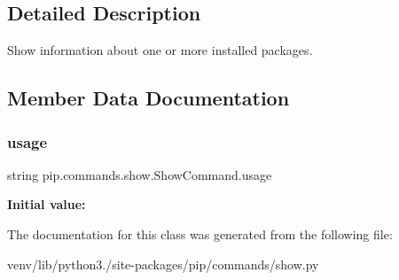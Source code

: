 \subsection{Detailed Description}
\begin{DoxyVerb}Show information about one or more installed packages.\end{DoxyVerb}
 

\subsection{Member Data Documentation}
\mbox{\label{classpip_1_1commands_1_1show_1_1_show_command_a6cfb3b232f5280a3cd563a7dda7b927f}} 
\subsubsection{\texorpdfstring{usage}{usage}}
{\footnotesize\ttfamily string pip.\+commands.\+show.\+Show\+Command.\+usage\hspace{0.3cm}{\ttfamily [static]}}

{\bfseries Initial value\+:}
\begin{DoxyCode}
=  \textcolor{stringliteral}{"""}
\textcolor{stringliteral}{  %
\end{DoxyCode}


The documentation for this class was generated from the following file\+:\begin{DoxyCompactItemize}
\item 
venv/lib/python3./site-\/packages/pip/commands/show.\+py\end{DoxyCompactItemize}
